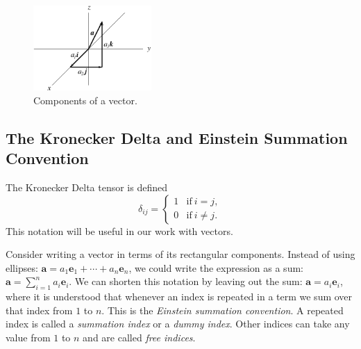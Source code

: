 \begin{figure}[htb!]
\begin{center}
  \includegraphics[width=0.4\textwidth]{algebra/vectors/veccomp}
\end{center}
\caption{Components of a vector.}
\label{veccomp}
\end{figure}






\subsection{The Kronecker Delta and Einstein Summation Convention}


The Kronecker Delta tensor is defined
\[
\delta_{ij} = 
        \begin{cases}
        1 &\mathrm{if}\ i = j, \\
        0 &\mathrm{if}\ i \neq j.
        \end{cases}
\]
This notation will be useful in our work with vectors.



Consider writing a vector in terms of its rectangular components.  Instead
of using ellipses: $\mathbf{a} = a_1 \mathbf{e}_1 + \cdots + a_n \mathbf{e}_n$,
we could write the expression as a sum: 
$\mathbf{a} = \sum_{i = 1}^n a_i \mathbf{e}_i$.  We can shorten this notation
by leaving out the sum: $\mathbf{a} = a_i \mathbf{e}_i$, where it is 
understood that whenever an index is repeated in  a term we sum over that 
index from $1$ to $n$.  This is the \textit{Einstein summation convention}.
A repeated index is called a \textit{summation
index} or a \textit{dummy index}.  Other indices can take any value from $1$ to 
$n$ and are called \textit{free indices}.




